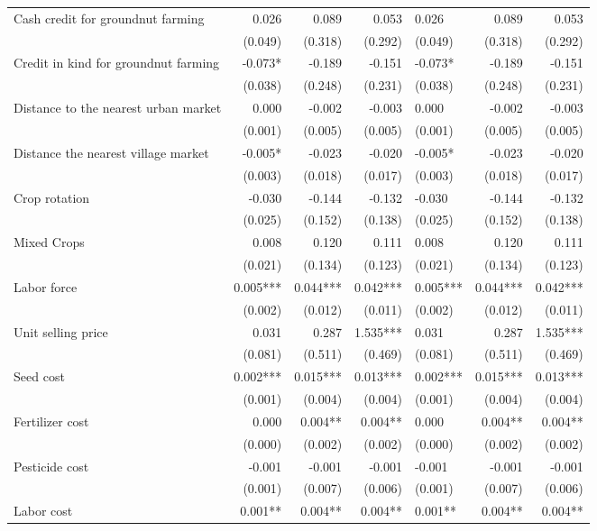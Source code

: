 \documentclass[
]{article}
\begin{document}
\begin{longtable}[t]{lrrrlrr}
Cash credit for groundnut farming & 0.026 & 0.089 & 0.053 & 0.026 & 0.089 & 0.053\\
 & (0.049) & (0.318) & (0.292) & (0.049) & (0.318) & (0.292)\\
Credit in kind for groundnut farming & -0.073* & -0.189 & -0.151 & -0.073* & -0.189 & -0.151\\
 & (0.038) & (0.248) & (0.231) & (0.038) & (0.248) & (0.231)\\
\addlinespace
Distance to the nearest urban market & 0.000 & -0.002 & -0.003 & 0.000 & -0.002 & -0.003\\
 & (0.001) & (0.005) & (0.005) & (0.001) & (0.005) & (0.005)\\
Distance the nearest village market & -0.005* & -0.023 & -0.020 & -0.005* & -0.023 & -0.020\\
 & (0.003) & (0.018) & (0.017) & (0.003) & (0.018) & (0.017)\\
Crop rotation & -0.030 & -0.144 & -0.132 & -0.030 & -0.144 & -0.132\\
\addlinespace
 & (0.025) & (0.152) & (0.138) & (0.025) & (0.152) & (0.138)\\
Mixed Crops & 0.008 & 0.120 & 0.111 & 0.008 & 0.120 & 0.111\\
 & (0.021) & (0.134) & (0.123) & (0.021) & (0.134) & (0.123)\\
Labor force & 0.005*** & 0.044*** & 0.042*** & 0.005*** & 0.044*** & 0.042***\\
 & (0.002) & (0.012) & (0.011) & (0.002) & (0.012) & (0.011)\\
\addlinespace
Unit selling price & 0.031 & 0.287 & 1.535*** & 0.031 & 0.287 & 1.535***\\
 & (0.081) & (0.511) & (0.469) & (0.081) & (0.511) & (0.469)\\
Seed cost & 0.002*** & 0.015*** & 0.013*** & 0.002*** & 0.015*** & 0.013***\\
 & (0.001) & (0.004) & (0.004) & (0.001) & (0.004) & (0.004)\\
Fertilizer cost & 0.000 & 0.004** & 0.004** & 0.000 & 0.004** & 0.004**\\
\addlinespace
 & (0.000) & (0.002) & (0.002) & (0.000) & (0.002) & (0.002)\\
Pesticide cost & -0.001 & -0.001 & -0.001 & -0.001 & -0.001 & -0.001\\
 & (0.001) & (0.007) & (0.006) & (0.001) & (0.007) & (0.006)\\
Labor cost & 0.001** & 0.004** & 0.004** & 0.001** & 0.004** & 0.004**\\

\end{longtable}
\end{document}
